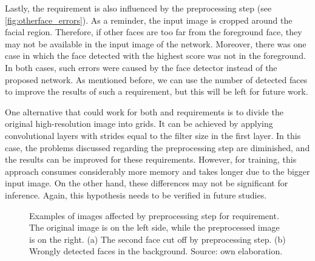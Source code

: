 Lastly, the \otherfacesortoys requirement is also influenced by the preprocessing step (see \autoref{fig:otherface_errors}). As a reminder, the input image is cropped around the facial region. Therefore, if other faces are too far from the foreground face, they may not be available in the input image of the network. Moreover, there was one case in which the face detected with the highest score was not in the foreground. In both cases, such errors were caused by the face detector instead of the proposed network. As mentioned before, we can use the number of detected faces to improve the results of such a requirement, but this will be left for future work.
 
 
One alternative that could work for both \pixelation and \otherfacesortoys requirements is to divide the original high-resolution image into grids. It can be achieved by applying convolutional layers with strides equal to the filter size in the first layer. In this case, the problems discussed regarding the preprocessing step are diminished, and the results can be improved for these requirements. However, for training, this approach consumes considerably more memory and takes longer due to the bigger input image. On the other hand, these differences may not be significant for inference. Again, this hypothesis needs to be verified in future studies.
 
\begin{figure}[htb]
\centering
{}
\caption{Examples of images affected by preprocessing step for \otherfacesortoys requirement. The original image is on the left side, while the preprocessed image is on the right. (a) The second face cut off by preprocessing step. (b) Wrongly detected faces in the background. Source: own elaboration.}
\label{fig:otherface_errors}
\end{figure}
 
